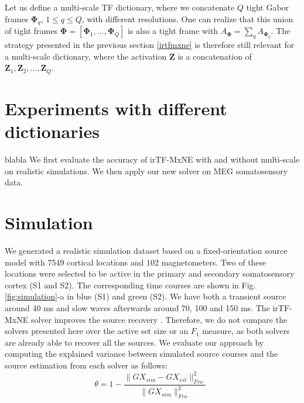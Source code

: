 Let us define a multi-scale TF dictionary, where we concatenate $Q$ tight Gabor frames $\mathbf{\Phi}_q$, $ 1 \leq q \leq Q$, with different resolutions. One can realize that this union of tight frames $\mathbf{\Phi} = [\mathbf{\Phi}_1, \dots, \mathbf{\Phi}_Q]$ is also a tight frame with $A_\mathbf{\Phi} = \sum_q A_{\mathbf{\Phi}_q}$. The strategy presented in the previous section \ref{irtfmxne} is therefore still relevant for a multi-scale dictionary, where the activation $\mathbf{Z}$ is a concatenation of $\mathbf{Z}_1, \mathbf{Z}_2, ..., \mathbf{Z}_Q$.

\section{Experiments with different dictionaries}
blabla
We first evaluate the accuracy of irTF-MxNE with and without multi-scale on realistic simulations. We then apply our new solver on MEG somatosensory data.

\section{Simulation}
We generated a realistic simulation dataset based on a fixed-orientation source model with 7549 cortical locations and 102 magnetometers. Two of these locations were selected to be active in the primary and secondary somatosensory cortex (S1 and S2). The corresponding time courses are shown in Fig. \ref{fig:simulation}-a in blue (S1) and green (S2). We have both a transient source around 40 ms and slow waves afterwards around 70, 100 and 150 ms. The irTF-MxNE solver improves the source recovery \cite{daniel15}. Therefore, we do not compare the solvers presented here over the active set size or an $F_1$ measure, %
as both solvers are already able to recover all the sources. %
We evaluate our approach by computing  %
the explained variance between simulated source courses and the source estimation from each solver as follows:
\begin{equation}
	\theta = 1 - \frac{\|GX_{sim}-GX_{est}\|^2_{Fro}}{\|GX_{sim}\|^2_{Fro}} \enspace
\end{equation}

